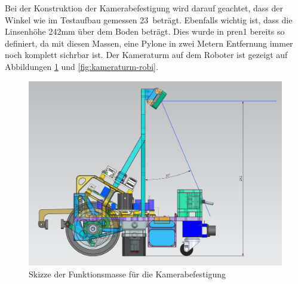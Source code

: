 Bei der Konstruktion der Kamerabefestigung wird darauf geachtet, dass der Winkel wie im Testaufbau gemessen 23\textdegree\ beträgt. Ebenfalls wichtig ist, dass die Linsenhöhe 242mm über dem Boden beträgt. Dies wurde in \acrshort{pren1} bereits so definiert, da mit diesen Massen, eine Pylone in zwei Metern Entfernung immer noch komplett sichrbar ist. Der Kameraturm auf dem Roboter ist gezeigt auf Abbildungen \ref{fig:Skizze der Funktionsmasse für die Kamerabefestigung} und \ref{fig:kameraturm-robi}.


\begin{figure}[H]
\centering
\begin{minipage}[b]{0.58\textwidth}
\centering
\includegraphics[width= \textwidth ]{assets/MT/Sichtfeld_Roboter.png}
\caption{Skizze der Funktionsmasse für die Kamerabefestigung}
\label{fig:Skizze der Funktionsmasse für die Kamerabefestigung}


\end{minipage}
\end{figure}
